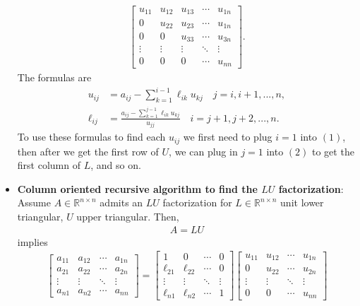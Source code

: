 \documentclass{report}
\begin{document}
\begin{itemize}
\begin{align*}
                \begin{bmatrix}
                    u_{11} & u_{12} & u_{13} & \cdots & u_{1n} \\
                    0  & u_{22} & u_{23} & \cdots & u_{1n} \\
                    0& 0& u_{33} & \cdots & u_{3n} \\
                    \vdots & \vdots & \vdots & \ddots & \vdots \\
                    0 & 0 & 0 & \cdots & u_{nn}
                \end{bmatrix}
            .\end{align*}
            The formulas are
        \begin{align*}
            u_{ij} &= a_{ij} - \sum_{k=1}^{i-1}\ell_{ik}u_{kj} \quad j=i,i+1,...,n \tag{1}, \\
            \ell_{ij} &= \frac{a_{ij} - \sum_{k=1}^{j-1}\ell_{ik}u_{kj}}{u_{jj}} \quad i=j+1,j+2,...,n \tag{2}
        .\end{align*}
        \bigbreak \noindent 
        To use these formulas to find each $u_{ij}$ we first need to plug $i=1$ into $(1)$, then after we get the first row of $U$, we can plug in $j=1$ into $(2)$ to get the first column of $L$, and so on.
        \item \textbf{Column oriented recursive algorithm to find the $LU$ factorization}: Assume $A \in \mathbb{R}^{n\times n }$ admits an $LU$ factorization for $L\in \mathbb{R}^{n\times n}$ unit lower triangular, $U$ upper triangular. Then,
            \begin{align*}
                A = LU
            \end{align*}
            implies
            \begin{align*}
                \begin{bmatrix} a_{11} & a_{12} & \cdots & a_{1n} \\ a_{21} & a_{22} & \cdots & a_{2n} \\ \vdots & \vdots & \ddots & \vdots \\ a_{n1} & a_{n2} & \cdots & a_{nn} \end{bmatrix} = 
                \begin{bmatrix} 1 & 0 & \cdots & 0 \\ \ell_{21} & \ell_{22} & \cdots & 0 \\ \vdots & \vdots & \ddots & \vdots \\ \ell_{n1} & \ell_{n2} & \cdots & 1 \end{bmatrix}
                \begin{bmatrix} u_{11} & u_{12} & \cdots & u_{1n} \\ 0 & u_{22} & \cdots & u_{2n} \\ \vdots & \vdots & \ddots & \vdots \\ 0 & 0 & \cdots & u_{nn} \end{bmatrix}

\end{align*}
\end{itemize}
\end{document}
